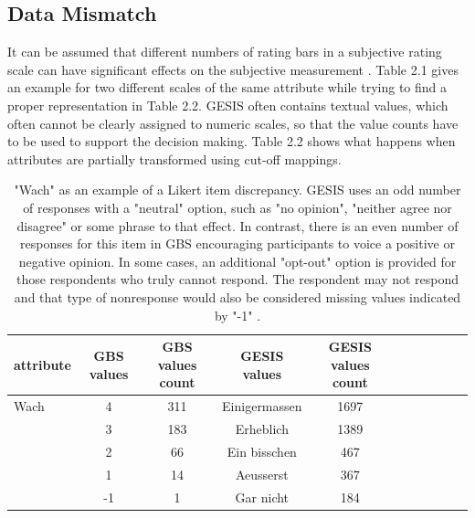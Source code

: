 \subsection{Data Mismatch}

It can be assumed that different numbers of rating bars in a subjective rating scale can have significant effects on the subjective measurement \cite{heeringa}. Table 2.1 gives an example for two different scales of the same attribute while trying to find a proper representation in Table 2.2. GESIS often contains textual values, which often cannot be clearly assigned to numeric scales, so that the value counts have to be used to support the decision making. Table 2.2 shows what happens when attributes are partially transformed using cut-off mappings.
\vspace{0.33cm}
\begin{table}[ht]
    \begin{center}
	\captionsetup{width= 400pt}
            {\footnotesize
            \begin{tabular}{l|c|ccccccccc}
                \hline \hline
		attribute & GBS values & GBS values count &  GESIS values & GESIS values count \\
                \hline \hline
                     Wach & 4 & 311 & Einigermassen & 1697 \\
                     & 3 & 183 & Erheblich & 1389 \\
                     & 2 & 66 & Ein bisschen & 467 \\ 
              	& 1 & 14 & Aeusserst & 367 \\	
		& -1 & 1 & Gar nicht & 184 \\		
	     \hline \hline
            \end{tabular}}
        \caption{"Wach" as an example of a Likert item discrepancy. GESIS uses an odd number of responses with a "neutral" option, such as "no opinion", "neither agree nor disagree" or some phrase to that effect. In contrast, there is an even number of responses for this item in GBS encouraging participants to voice a positive or negative opinion. In some cases, an additional "opt-out" option is provided for those respondents who truly cannot respond. The respondent may not respond and that type of nonresponse would also be considered missing values indicated by "-1" \cite{likert4}.}
\end{center}
\end{table}

